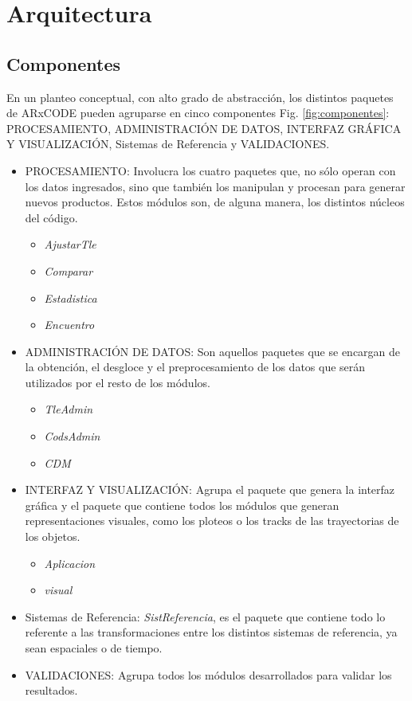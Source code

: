 \section{Arquitectura}

\subsection*{Componentes}\label{subsec:componentes}
En un planteo conceptual, con alto grado de abstracci\'on, los distintos paquetes de ARxCODE pueden agruparse en cinco componentes Fig.  \ref{fig:componentes}: PROCESAMIENTO, ADMINISTRACI\'ON DE DATOS, INTERFAZ GR\'AFICA Y VISUALIZACI\'ON, Sistemas de Referencia y VALIDACIONES.\\

\begin{itemize}
 \item PROCESAMIENTO: Involucra los cuatro paquetes que, no s\'olo operan con los datos ingresados, sino que tambi\'en los manipulan y procesan para generar nuevos productos. Estos m\'odulos son, de alguna manera, los distintos n\'ucleos del c\'odigo.\\

 \begin{itemize}
 \itemsep0em
  \item {\it{AjustarTle}}
  \item {\it{Comparar}}
  \item {\it{Estadistica}}
  \item {\it{Encuentro}}
 \end{itemize}

 \item ADMINISTRACI\'ON DE DATOS: Son aquellos paquetes que se encargan de la obtenci\'on, el desgloce y el preprocesamiento de los datos que ser\'an utilizados por el resto de los m\'odulos.

 \begin{itemize}
 \itemsep0em
  \item {\it{TleAdmin}}
  \item {\it{CodsAdmin}}
  \item {\it{CDM}}
 \end{itemize}

 \item INTERFAZ Y VISUALIZACI\'ON: Agrupa el paquete que genera la interfaz gr\'afica y el paquete que contiene todos los m\'odulos que generan representaciones visuales, como los ploteos o los tracks de las trayectorias de los objetos.\\
 \begin{itemize}
 \itemsep0em
 \item {\it{Aplicacion}}
 \item {\it{visual}}
 \end{itemize}
 \item Sistemas de Referencia: {\it{SistReferencia}}, es el paquete que contiene todo lo referente a las transformaciones entre los distintos sistemas de referencia, ya sean espaciales o de tiempo.
 \item VALIDACIONES: Agrupa todos los m\'odulos desarrollados para validar los resultados.
\end{itemize}


